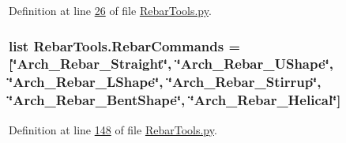 Definition at line \hyperlink{RebarTools_8py_source_l00026}{26} of file \hyperlink{RebarTools_8py_source}{Rebar\+Tools.\+py}.

\subsubsection[{\texorpdfstring{Rebar\+Commands}{RebarCommands}}]{\setlength{\rightskip}{0pt plus 5cm}list Rebar\+Tools.\+Rebar\+Commands = \mbox{[}\char`\"{}Arch\+\_\+\+Rebar\+\_\+\+Straight\char`\"{}, \char`\"{}Arch\+\_\+\+Rebar\+\_\+\+U\+Shape\char`\"{}, \char`\"{}Arch\+\_\+\+Rebar\+\_\+\+L\+Shape\char`\"{}, \char`\"{}Arch\+\_\+\+Rebar\+\_\+\+Stirrup\char`\"{}, \char`\"{}Arch\+\_\+\+Rebar\+\_\+\+Bent\+Shape\char`\"{}, \char`\"{}Arch\+\_\+\+Rebar\+\_\+\+Helical\char`\"{}\mbox{]}}\hypertarget{namespaceRebarTools_ad80a0d98e5b180cb5f37b3d3702d4d4d}{}\label{namespaceRebarTools_ad80a0d98e5b180cb5f37b3d3702d4d4d}


Definition at line \hyperlink{RebarTools_8py_source_l00148}{148} of file \hyperlink{RebarTools_8py_source}{Rebar\+Tools.\+py}.

